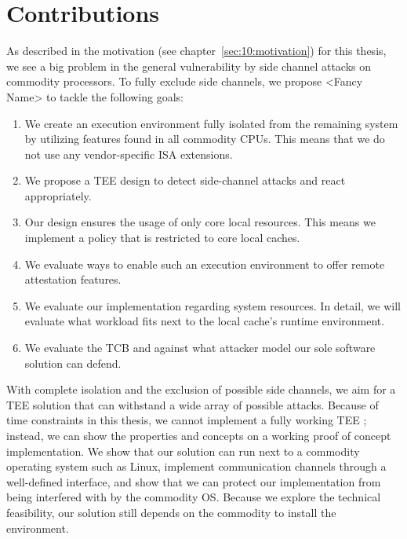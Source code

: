 \section{Contributions}
\label{sec:10:contributions}
As described in the motivation (see chapter~\ref{sec:10:motivation}) for this
thesis, we see a big problem in the general vulnerability by side channel
attacks on commodity processors. To fully exclude side channels, we propose
<Fancy Name> to tackle the following
goals:

\begin{enumerate}
    \item We create an execution environment fully isolated from the remaining
          system by utilizing features found in all commodity CPUs. This means
          that we do not use any vendor-specific ISA extensions.
    \item We propose a TEE design to detect side-channel attacks and react
          appropriately.
    \item Our design ensures the usage of only core local resources. This means
          we implement a policy that is restricted to core local caches.
    \item We evaluate ways to enable such an execution environment to offer
          remote attestation features.
    \item We evaluate our implementation regarding system resources. In detail,
          we will evaluate what workload fits next to the local cache's runtime
          environment.
    \item We evaluate the TCB and against what attacker model our sole software
          solution can defend.
\end{enumerate}

With complete isolation and the exclusion of possible side channels, we aim for
a TEE solution that can withstand a wide array of possible attacks. Because of
time constraints in this thesis, we cannot implement a fully working TEE ;
instead, we can show the properties and concepts on a working proof of concept
implementation. We show that our solution can run next to a commodity operating
system such as Linux, implement communication channels through a well-defined
interface, and show that we can protect our implementation from being interfered
with by the commodity OS. Because we explore the technical feasibility, our
solution still depends on the commodity to install the environment.
